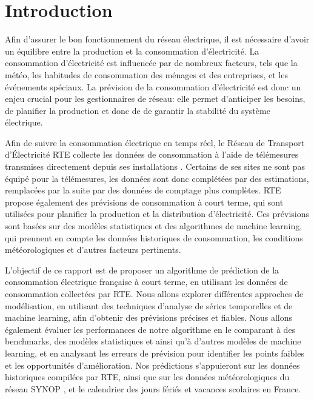 \section{Introduction}

\noindent

Afin d'assurer le bon fonctionnement du réseau électrique, il est nécessaire d'avoir un équilibre entre la production et la consommation d'électricité. La consommation d'électricité est influencée par de nombreux facteurs, tels que la météo, les habitudes de consommation des ménages et des entreprises, et les événements spéciaux. La prévision de la consommation d'électricité est donc un enjeu crucial pour les gestionnaires de réseau: elle permet d'anticiper les besoins, de planifier la production et donc de de garantir la stabilité du système électrique. 

Afin de suivre la consommation électrique en temps réel, le Réseau de Transport d’Électricité RTE collecte les données de consommation à l'aide de télémesures transmises directement depuis ses installations \parencite{rte_eco2mix_2026}. Certains de ses sites ne sont pas équipé pour la télémesures, les données sont donc complétées par des estimations, remplacées par la suite par des données de comptage plus complètes. RTE propose également des prévisions de consommation à court terme, qui sont utilisées pour planifier la production et la distribution d'électricité. Ces prévisions sont basées sur des modèles statistiques et des algorithmes de machine learning, qui prennent en compte les données historiques de consommation, les conditions météorologiques et d'autres facteurs pertinents.

L'objectif de ce rapport est de proposer un algorithme de prédiction de la consommation électrique française à court terme, en utilisant les données de consommation collectées par RTE. Nous allons explorer différentes approches de modélisation, en utilisant des techniques d'analyse de séries temporelles et de machine learning, afin d'obtenir des prévisions précises et fiables. Nous allons également évaluer les performances de notre algorithme en le comparant à des benchmarks, des modèles statistiques et ainsi qu'à d'autres modèles de machine learning, et en analysant les erreurs de prévision pour identifier les points faibles et les opportunités d'amélioration. Nos prédictions s'appuieront sur les données historiques compilées par RTE, ainsi que sur les données météorologiques du réseau SYNOP \parencite{meteo_france_synop_2026}, et le calendrier des jours fériés et vacances scolaires en France.
